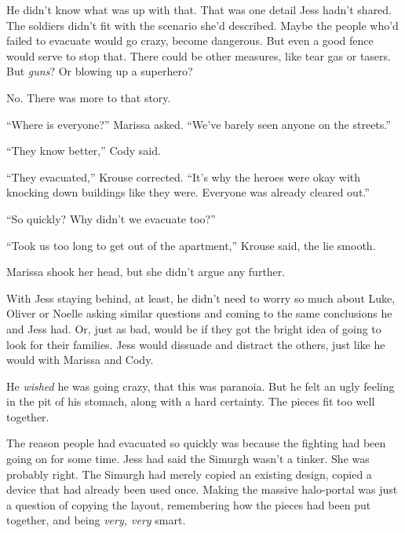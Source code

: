 He didn't know what was up with that.  That was one detail Jess hadn't shared.  The soldiers didn't fit with the scenario she'd described.  Maybe the people who'd failed to evacuate would go crazy, become dangerous.  But even a good fence would serve to stop that.  There could be other measures, like tear gas or tasers.  But \emph{guns}?  Or blowing up a superhero?



No.  There was more to that story.



``Where is everyone?'' Marissa asked.  ``We've barely seen anyone on the streets.''



``They know better,'' Cody said.



``They evacuated,'' Krouse corrected.  ``It's why the heroes were okay with knocking down buildings like they were.  Everyone was already cleared out.''



``So quickly?  Why didn't we evacuate too?''



``Took us too long to get out of the apartment,'' Krouse said, the lie smooth.



Marissa shook her head, but she didn't argue any further.



With Jess staying behind, at least, he didn't need to worry so much about Luke, Oliver or Noelle asking similar questions and coming to the same conclusions he and Jess had.  Or, just as bad, would be if they got the bright idea of going to look for their families.  Jess would dissuade and distract the others, just like he would with Marissa and Cody.



He \emph{wished} he was going crazy, that this was paranoia.  But he felt an ugly feeling in the pit of his stomach, along with a hard certainty.  The pieces fit too well together.



The reason people had evacuated so quickly was because the fighting had been going on for some time.  Jess had said the Simurgh wasn't a tinker.  She was probably right.  The Simurgh had merely copied an existing design, copied a device that had already been used once.  Making the massive halo-portal was just a question of copying the layout, remembering how the pieces had been put together, and being \emph{very, very }smart.



